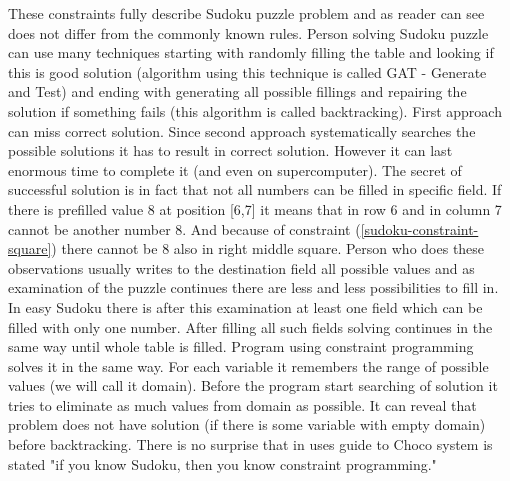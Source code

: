 These constraints fully describe Sudoku puzzle problem and as reader can see does not differ from the commonly known rules. Person solving Sudoku puzzle can use many techniques starting with randomly filling the table and looking if this is good solution (algorithm using this technique is called GAT - Generate and Test) and ending with generating all possible fillings and repairing the solution if something fails (this algorithm is called backtracking). First approach can miss correct solution. Since second approach systematically searches the possible solutions it has to result in correct solution. However it can last enormous time to complete it (and even on supercomputer). The secret of successful solution is in fact that not all numbers can be filled in specific field. If there is prefilled value 8 at position [6,7] it means that in row 6 and in column 7 cannot be another number 8. And because of constraint (\ref{sudoku-constraint-square}) there cannot be 8 also in right middle square. Person who does these observations usually writes to the destination field all possible values and as examination of the puzzle continues there are less and less possibilities to fill in. In easy Sudoku there is after this examination at least one field which can be filled with only one number. After filling all such fields solving continues in the same way until whole table is filled. Program using constraint programming solves it in the same way. For each variable it remembers the range of possible values (we will call it domain). Before the program start searching of solution it tries to eliminate as much values from domain as possible. It can reveal that problem does not have solution (if there is some variable with empty domain) before backtracking. There is no surprise that in uses guide to Choco system is stated "if you know Sudoku, then you know constraint programming."

